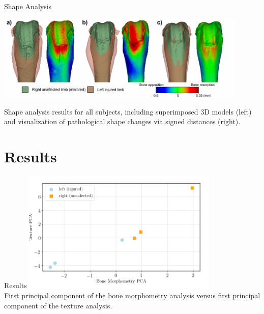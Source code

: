 \documentclass[10pt,aspectratio=169]{beamer}
\begin{document}
\begin{frame}{Shape Analysis}
  \begin{center}
  \includegraphics[width=0.9\textwidth]{./figures/analysis_shape.png}\\
  \end{center}
  \vspace{0.1cm}
  \centering
  Shape analysis results for all subjects, including superimposed 3D models (left) and visualization of pathological shape changes via signed distances (right).
\end{frame}

{
\section{Results}
\begin{frame}{Results}
  \centering
  \includegraphics[width=0.7\textwidth]{./figures/features_pcaBoneVSpcaTexture1000Bins.png}\\
  \vspace{0.1cm}
  First principal component of the bone morphometry analysis versus first principal component of the texture analysis.
\end{frame}
}
\end{document}
